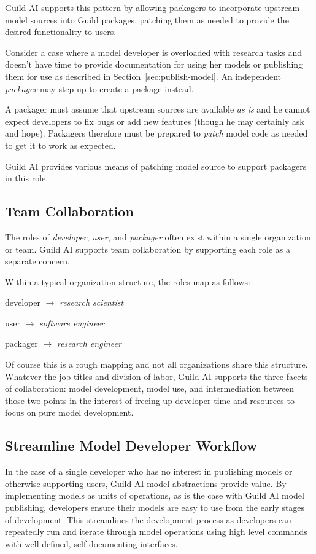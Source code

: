 \documentclass{article}
\begin{document}
Guild AI supports this pattern by allowing packagers to incorporate
upstream model sources into Guild packages, patching them as needed to
provide the desired functionality to users.

Consider a case where a model developer is overloaded with research
tasks and doesn't have time to provide documentation for using her
models or publishing them for use as described in
Section~\ref{sec:publish-model}. An independent \emph{packager} may
step up to create a package instead.

A packager must assume that upstream sources are available \emph{as
  is} and he cannot expect developers to fix bugs or add new features
(though he may certainly ask and hope). Packagers therefore must be
prepared to \emph{patch} model code as needed to get it to work as
expected.

Guild AI provides various means of patching model source to support
packagers in this role.

\subsection{Team Collaboration}

The roles of \emph{developer}, \emph{user}, and \emph{packager} often
exist within a single organization or team. Guild AI supports team
collaboration by supporting each role as a separate concern.

Within a typical organization structure, the roles map as follows:

\setlength{\parindent}{1em}
developer $\rightarrow$ \emph{research scientist}

user $\rightarrow$ \emph{software engineer}

packager $\rightarrow$ \emph{research engineer}
\setlength{\parindent}{0em}

Of course this is a rough mapping and not all organizations share this
structure. Whatever the job titles and division of labor, Guild AI
supports the three facets of collaboration: model development, model
use, and intermediation between those two points in the interest of
freeing up developer time and resources to focus on pure model
development.

\subsection{Streamline Model Developer Workflow}
\label{sec:streamline-workflow}

In the case of a single developer who has no interest in publishing
models or otherwise supporting users, Guild AI model abstractions
provide value. By implementing models as units of operations, as is
the case with Guild AI model publishing, developers ensure their
models are easy to use from the early stages of development. This
streamlines the development process as developers can repeatedly run
and iterate through model operations using high level commands with
well defined, self documenting interfaces.
\end{document}

